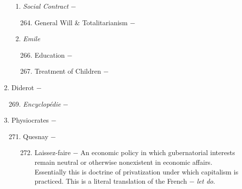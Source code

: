 \documentclass[12pt]{article}
\begin{document}
\begin{enumerate}
\begin{enumerate}[label=\arabic{*}.]
\item \textit{Social Contract} $-$

\begin{enumerate}[label=\arabic{*}.]
\setcounter{enumiii}{263}

\item General Will \& Totalitarianism $-$

\end{enumerate}
\setcounter{enumii}{264}

\item \textit{Emile}

\begin{enumerate}[label=\arabic{*}.]
\setcounter{enumiii}{265}

\item Education $-$ 

\item Treatment of Children $-$

\end{enumerate}
\end{enumerate}
\setcounter{enumi}{267}

\item Diderot $-$ 

\begin{enumerate}[label=\arabic{*}.]
\setcounter{enumii}{268}

\item \textit{Encyclop\'edie} $-$ 

\end{enumerate}
\setcounter{enumi}{269}

\item Physiocrates $-$

\begin{enumerate}[label=\arabic{*}.]
\setcounter{enumii}{270}

\item Quesnay $-$ 

\begin{enumerate}[label=\arabic{*}.]
\setcounter{enumiii}{271}

\item Laissez-faire $-$ An economic policy in which gubernatorial interests remain neutral or otherwise nonexistent in economic affairs. Essentially this is doctrine of privatization under which capitalism is practiced. This is a literal translation of the French $-$ \textit{let do}.

\end{enumerate}
\setcounter{enumii}{272}


\end{enumerate}
\end{enumerate}
\end{document}
